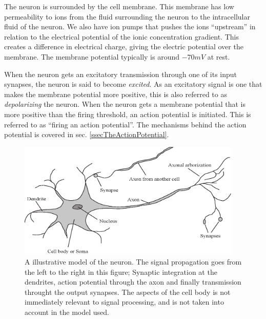 
The neuron is surrounded by the cell membrane. This membrane has low permeability to ions from the fluid surrounding the neuron to the intracellular fluid of the neuron.
We also have ion pumps that pushes the ions ``upstream'' in relation to the electrical potential of the ionic concentration gradient.
This creates a difference in electrical charge, giving the electric potential over the membrane.
The membrane potential typically is around $-70mV$ at rest. %


When the neuron gets an excitatory transmission through one of its input synapses, the neuron is said to become \emph{excited}. 
As an excitatory signal is one that makes the membrane potential more positive, this is also referred to as \emph{depolarizing} the neuron.
When the neuron gets a membrane potential that is more positive than the firing threshold, an action potential is initiated.
This is referred to as ``firing an action potential''.
The mechanisms behind the action potential is covered in sec. \ref{ssecTheActionPotential}.

\begin{figure}[hbt!p]
	\centering
	\includegraphics[width=0.95\textwidth]{ModellAvNeuronet}
	\caption{A illustrative model of the neuron. The signal propagation goes from the left to the right in this figure;
			Synaptic integration at the dendrites, action potential through the axon and finally transmission throught the output synapses. 
			The aspects of the cell body is not immediately relevant to signal processing, and is not taken into account in the model used. }
	\label{figFigurAvNeuronet}
\end{figure}

